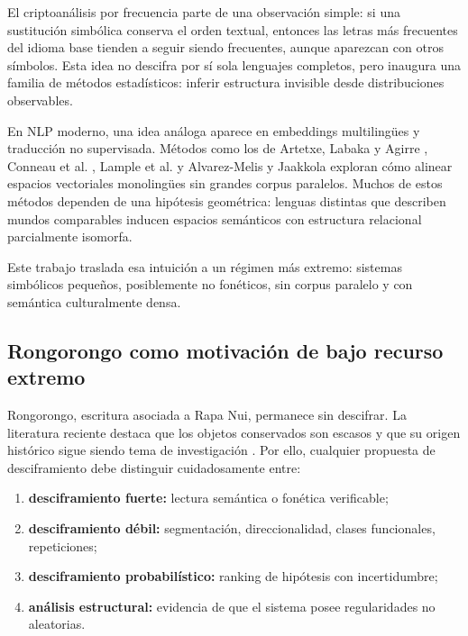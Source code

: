 \documentclass[11pt,a4paper]{article}
\newcommand{\1}{\mathbf{1}}
\numberwithin{equation}{section}
\begin{document}
El criptoanálisis por frecuencia parte de una observación simple: si una sustitución simbólica conserva el orden textual, entonces las letras más frecuentes del idioma base tienden a seguir siendo frecuentes, aunque aparezcan con otros símbolos. Esta idea no descifra por sí sola lenguajes completos, pero inaugura una familia de métodos estadísticos: inferir estructura invisible desde distribuciones observables.

En NLP moderno, una idea análoga aparece en embeddings multilingües y traducción no supervisada. Métodos como los de Artetxe, Labaka y Agirre \cite{artetxe2017almost,artetxe2018framework}, Conneau et al. \cite{conneau2018word}, Lample et al. \cite{lample2018unsupervised} y Alvarez-Melis y Jaakkola \cite{alvarezmelis2018gw} exploran cómo alinear espacios vectoriales monolingües sin grandes corpus paralelos. Muchos de estos métodos dependen de una hipótesis geométrica: lenguas distintas que describen mundos comparables inducen espacios semánticos con estructura relacional parcialmente isomorfa.

Este trabajo traslada esa intuición a un régimen más extremo: sistemas simbólicos pequeños, posiblemente no fonéticos, sin corpus paralelo y con semántica culturalmente densa.

\subsection{Rongorongo como motivación de bajo recurso extremo}

Rongorongo, escritura asociada a Rapa Nui, permanece sin descifrar. La literatura reciente destaca que los objetos conservados son escasos y que su origen histórico sigue siendo tema de investigación \cite{ferrara2024rongorongo}. Por ello, cualquier propuesta de desciframiento debe distinguir cuidadosamente entre:

\begin{enumerate}[label=(\roman*)]
    \item \textbf{desciframiento fuerte:} lectura semántica o fonética verificable;
    \item \textbf{desciframiento débil:} segmentación, direccionalidad, clases funcionales, repeticiones;
    \item \textbf{desciframiento probabilístico:} ranking de hipótesis con incertidumbre;
    \item \textbf{análisis estructural:} evidencia de que el sistema posee regularidades no aleatorias.
\end{enumerate}
\end{document}
